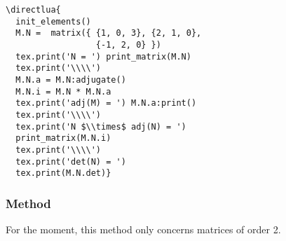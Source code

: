 \begin{minipage}{.6\textwidth}
\begin{verbatim}
\directlua{
  init_elements()
  M.N =  matrix({ {1, 0, 3}, {2, 1, 0},
                  {-1, 2, 0} })
  tex.print('N = ') print_matrix(M.N)
  tex.print('\\\\')
  M.N.a = M.N:adjugate()
  M.N.i = M.N * M.N.a
  tex.print('adj(M) = ') M.N.a:print()
  tex.print('\\\\')
  tex.print('N $\\times$ adj(N) = ')
  print_matrix(M.N.i)
  tex.print('\\\\')
  tex.print('det(N) = ')
  tex.print(M.N.det)}
\end{verbatim}
\end{minipage}
\begin{minipage}{.4\textwidth}
\end{minipage}


\newpage

\subsubsection{Method } %
\label{ssub:diagonalization}

For the moment, this method only concerns matrices of order 2.

